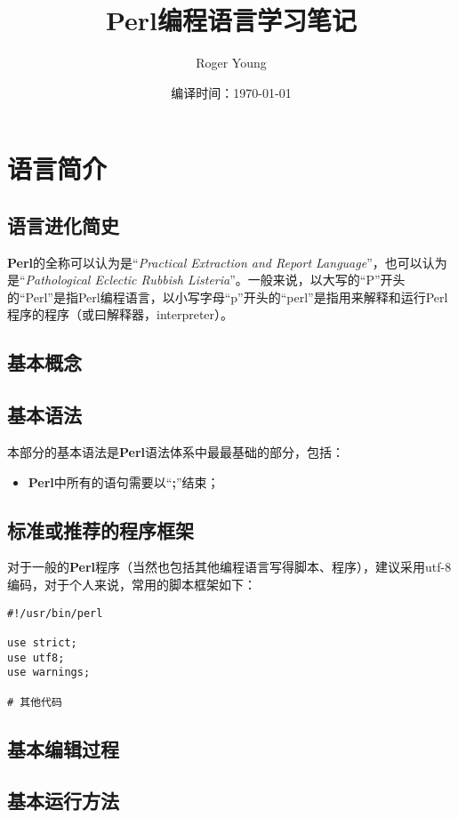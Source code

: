 \documentclass[11pt]{book}
\title{Perl编程语言学习笔记}
\author{Roger Young}
\date{编译时间：\today}
\newcommand{\programminglanguage}[1]{\textbf{#1}}
\begin{document}
	
	\maketitle
	\tableofcontents
	\newpage
	
	\chapter{语言简介}
		\section{语言进化简史}
			\programminglanguage{Perl}的全称可以认为是“\textit{Practical Extraction and Report Language}”，也可以认为是“\textit{Pathological Eclectic Rubbish Listeria}”。一般来说，以大写的“P”开头的“Perl”是指Perl编程语言，以小写字母“p”开头的“perl”是指用来解释和运行Perl程序的程序（或曰解释器，interpreter）。
		\section{基本概念}
			
		\section{基本语法}
			本部分的基本语法是\programminglanguage{Perl}语法体系中最最基础的部分，包括：
			\begin{itemize}
				\item \programminglanguage{Perl}中所有的语句需要以“\textbf{;}”结束；
			\end{itemize}
		\section{标准或推荐的程序框架}
			对于一般的\programminglanguage{Perl}程序（当然也包括其他编程语言写得脚本、程序），建议采用utf-8编码，对于个人来说，常用的脚本框架如下：
			
\lstset{language=Perl} 
\begin{lstlisting}
#!/usr/bin/perl

use strict;
use utf8;
use warnings;

# 其他代码
\end{lstlisting}

		\section{基本编辑过程}
		\section{基本运行方法}
		
\end{document}
